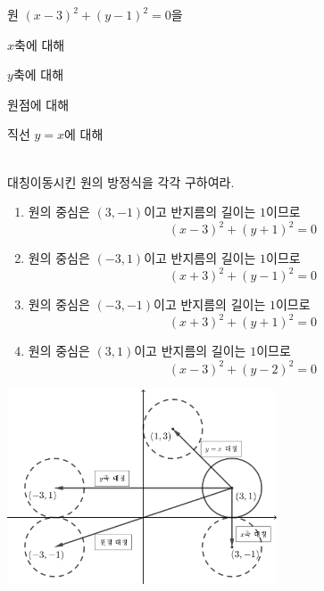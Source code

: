 \documentclass{oblivoir}
\begin{document}
\newpage
%
\exam{}\label{rreflect2}
원 \((x-3)^2+(y-1)^2=0\)을\\[10pt]
\begin{enumerate*}[itemjoin={,\quad}]
\item
\(x\)축에 대해
\item
\(y\)축에 대해
\item
원점에 대해
\item
직선 \(y=x\)에 대해
\end{enumerate*}\\[10pt]
대칭이동시킨 원의 방정식을 각각 구하여라.
\begin{mdframed}
\begin{enumerate}
\item
원의 중심은 \((3,-1)\)이고 반지름의 길이는 \(1\)이므로
\[(x-3)^2+(y+1)^2=0\]
\item
원의 중심은 \((-3,1)\)이고 반지름의 길이는 \(1\)이므로
\[(x+3)^2+(y-1)^2=0\]
\item
원의 중심은 \((-3,-1)\)이고 반지름의 길이는 \(1\)이므로
\[(x+3)^2+(y+1)^2=0\]
\item
원의 중심은 \((3,1)\)이고 반지름의 길이는 \(1\)이므로
\[(x-3)^2+(y-2)^2=0\]
\end{enumerate}
\end{mdframed}
\begin{center}
\includegraphics[width=0.6\textwidth]{rreflect_2}
\end{center}
\end{document}
